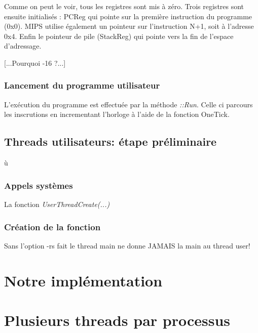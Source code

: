 \documentclass[a4paper,10pt]{article}
\begin{document}
Comme on peut le voir, tous les registres sont mis à zéro. Trois
registres sont ensuite initialisés : PCReg qui pointe sur la première
instruction du programme (0x0). MIPS utilise également un pointeur sur
l'instruction N+1, soit à l'adresse 0x4. Enfin le pointeur de pile (StackReg)
qui pointe vers la fin de l'espace d'adressage.

[...Pourquoi -16 ?...]

\subsubsection{Lancement du programme utilisateur}

L'exécution du programme est effectuée par la méthode \textit{::Run}. Celle ci
parcours les inscrutions en incrementant l'horloge à l'aide de la fonction
OneTick.

\subsection{Threads utilisateurs: étape préliminaire}

ù\subsubsection{Appels systèmes}

  La fonction \textit{UserThreadCreate(...)}

\subsubsection{Création de la fonction}

Sans l'option -rs fait le thread  main ne donne JAMAIS la main au thread user!

\section{Notre implémentation}



\section{Plusieurs threads par processus}
\end{document}
